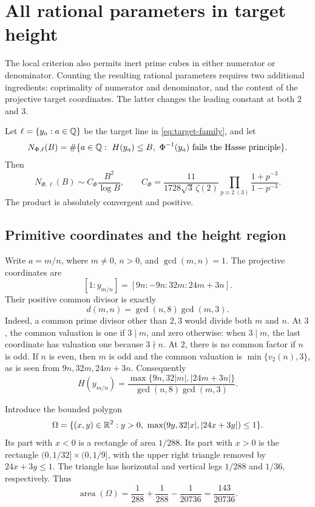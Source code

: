 \section{All rational parameters in target height}\label{sec:rational-counting}

The local criterion also permits inert prime cubes in either numerator or
denominator.  Counting the resulting rational parameters requires two
additional ingredients: coprimality of numerator and denominator, and the
content of the projective target coordinates.  The latter changes the
leading constant at both \(2\) and \(3\).

\begin{theorem}\label{thm:rational-count}
Let \(\ell=\{y_a:a\in\mathbb Q\}\) be the target line in
\eqref{eq:target-family}, and let
\[
 N_{\Phi,\ell}(B)=
 \#\{a\in\mathbb Q:\ H(y_a)\le B,
       \ \Phi^{-1}(y_a)\text{ fails the Hasse principle}\}.
\]
Then
\begin{equation}
 N_{\Phi,\ell}(B)\sim C_\Phi\frac{B^2}{\log B},
 \qquad
 C_\Phi=
 \frac{11}{1728\sqrt3\,\zeta(2)}
 \prod_{p\equiv2\ (3)}\frac{1+p^{-3}}{1-p^{-3}}.
 \label{eq:rational-constant}
\end{equation}
The product is absolutely convergent and positive.
\end{theorem}

\subsection{Primitive coordinates and the height region}

Write \(a=m/n\), where \(m\ne0\), \(n>0\), and
\(\gcd(m,n)=1\).  The projective coordinates are
\[
 [1:y_{m/n}]=[9n:-9n:32m:24m+3n].
\]
Their positive common divisor is exactly
\[
 d(m,n)=\gcd(n,8)\gcd(m,3).
\]
Indeed, a common prime divisor other than \(2,3\) would divide both
\(m\) and \(n\).  At \(3\), the common valuation is one if
\(3\mid m\), and zero otherwise: when \(3\mid m\), the last
coordinate has valuation one because \(3\nmid n\).  At \(2\), there
is no common factor if \(n\) is odd.  If \(n\) is even, then \(m\)
is odd and the common valuation is \(\min\{v_2(n),3\}\), as is seen
from \(9n,32m,24m+3n\).  Consequently
\begin{equation}\label{eq:rational-height}
 H(y_{m/n})=
 \frac{\max\{9n,32|m|,|24m+3n|\}}
      {\gcd(n,8)\gcd(m,3)}.
\end{equation}

Introduce the bounded polygon
\[
 \Omega=\{(x,y)\in\mathbb R^2:y>0,
       \ \max(9y,32|x|,|24x+3y|)\le1\}.
\]
Its part with \(x<0\) is a rectangle of area \(1/288\).  Its part
with \(x>0\) is the rectangle
\((0,1/32]\times(0,1/9]\), with the upper right triangle removed by
\(24x+3y\le1\).  The triangle has horizontal and vertical legs
\(1/288\) and \(1/36\), respectively.  Thus
\begin{equation}\label{eq:rational-area}
 \operatorname{area}(\Omega)=
 \frac1{288}+\frac1{288}-\frac1{20736}
 =\frac{143}{20736}.
\end{equation}

